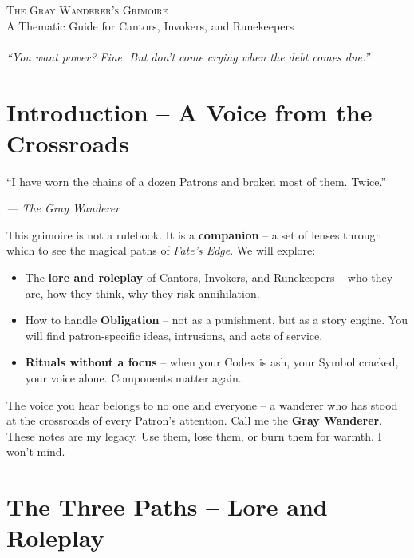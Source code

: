 \documentclass[10pt,a5paper]{book}
\begin{document}
\frontmatter
\thispagestyle{empty}
\vspace*{2cm}
\begin{center}
{\Huge\scshape The Gray Wanderer's Grimoire}\\[0.5cm]
{\Large A Thematic Guide for Cantors, Invokers, and Runekeepers}\\[1cm]
\\[1cm]
{\itshape “You want power? Fine. But don’t come crying when the debt comes due.”}
\end{center}
\vfill
\clearpage

\tableofcontents
\clearpage

\mainmatter

\chapter{Introduction – A Voice from the Crossroads}
\epigraph{“I have worn the chains of a dozen Patrons and broken most of them. Twice.”}{\textit{— The Gray Wanderer}}

This grimoire is not a rulebook. It is a \textbf{companion} – a set of lenses through which to see the magical paths of \textit{Fate's Edge}. We will explore:

\begin{itemize}
    \item The \textbf{lore and roleplay} of Cantors, Invokers, and Runekeepers – who they are, how they think, why they risk annihilation.
    \item How to handle \textbf{Obligation} – not as a punishment, but as a story engine. You will find patron‑specific ideas, intrusions, and acts of service.
    \item \textbf{Rituals without a focus} – when your Codex is ash, your Symbol cracked, your voice alone. Components matter again.
\end{itemize}

The voice you hear belongs to no one and everyone – a wanderer who has stood at the crossroads of every Patron’s attention. Call me the \textbf{Gray Wanderer}. These notes are my legacy. Use them, lose them, or burn them for warmth. I won’t mind.

\clearpage

\chapter{The Three Paths – Lore and Roleplay}
\end{document}
